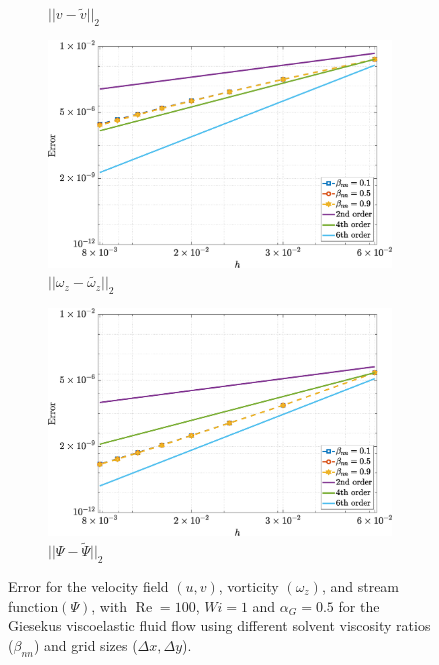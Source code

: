 \documentclass[preprint, 12pt]{elsarticle}
\begin{document}
\begin{figure}[H]
\begin{subfigure}[b]{.46\textwidth}
        \caption{$||v - \widetilde{v}||_{2}$}
        \label{error_v_2nd_Case1_giesekus_alphaG_0.5}
    \end{subfigure}
    \qquad
    \begin{subfigure}[b]{.46\textwidth}
        \includegraphics[width=\textwidth]{NormErr_2nd_Re_100_Wi_1_epsilon_0_xi_0_alphaG_0.5_Dt_1e-06_at_0.05_tipsim_1_MMS_12_Wz.eps}
        \caption{$||\omega_{z} - \widetilde{\omega_{z}}||_{2}$}
        \label{error_wz_2nd_Case1_giesekus_alphaG_0.5}
    \end{subfigure}
    \qquad
    \begin{subfigure}[b]{.46\textwidth}
        \includegraphics[width=\textwidth]{NormErr_2nd_Re_100_Wi_1_epsilon_0_xi_0_alphaG_0.5_Dt_1e-06_at_0.05_tipsim_1_MMS_12_Psi.eps}
        \caption{$||\Psi - \widetilde{\Psi}||_{2}$}
        \label{error_psi_2nd_Case1_oldorydbgiesekus_alphaG_0.5}
    \end{subfigure}
    \vspace{0.02cm}
    \caption{Error for the velocity field $({u},{v})$, vorticity $({\omega_{z}})$, and stream function$({\Psi})$, with $\operatorname{Re}=100$, $Wi=1$ and $\alpha_G=0.5$ for the Giesekus viscoelastic fluid flow using different solvent viscosity ratios ($\beta_{nn}$) and grid sizes ($\Delta x, \Delta y$).\label{GEerror051}}
\end{figure}
\end{document}
